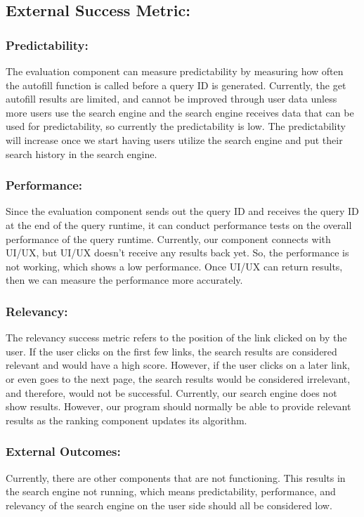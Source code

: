 \bigskip\subsection*{External Success Metric:}

\medskip\subsubsection*{Predictability:}
The evaluation component can measure predictability by measuring how often the 
autofill function is called before a query ID is generated. Currently, the get 
autofill results are limited, and cannot be improved through user data unless 
more users use the search engine and the search engine receives data that can be 
used for predictability, so currently the predictability is low. The 
predictability will increase once we start having users utilize the search engine 
and put their search history in the search engine.

\smallskip\subsubsection*{Performance:}
Since the evaluation component sends out the query ID and receives the query ID at 
the end of the query runtime, it can conduct performance tests on the overall 
performance of the query runtime. Currently, our component connects with UI/UX,  
but UI/UX doesn't receive any results back yet. So, the performance is not 
working, which shows a low performance. Once UI/UX can return results, then we can 
measure the performance more accurately.

\smallskip\subsubsection*{Relevancy:}
The relevancy success metric refers to the position of the link clicked on by the 
user. If the user clicks on the first few links, the search results are 
considered relevant and would have a high score. However, if the user clicks on a 
later link, or even goes to the next page, the search results would be considered 
irrelevant,  and therefore, would not be successful. Currently, our search engine 
does not show results. However, our program should normally be able to provide 
relevant results as the ranking component updates its algorithm. 

\subsubsection*{External Outcomes:}
Currently, there are other components that are not functioning. This results in 
the search engine not running, which means predictability, performance, and 
relevancy of the search engine on the user side should all be considered low. 
